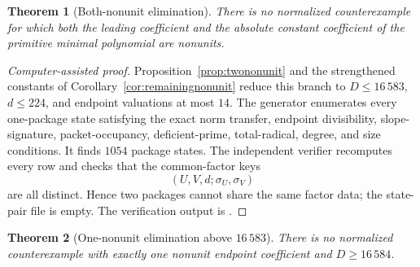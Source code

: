 \documentclass[11pt]{article}
\newtheorem{theorem}{Theorem}[section]
\theoremstyle{definition}
\begin{document}
\begin{theorem}[Both-nonunit elimination]
\label{thm:twononunitelimination}
There is no normalized counterexample for which both the leading coefficient
and the absolute constant coefficient of the primitive minimal polynomial are
nonunits.
\end{theorem}

\begin{proof}[Computer-assisted proof]
Proposition~\ref{prop:twononunit} and the strengthened constants of
Corollary~\ref{cor:remainingnonunit} reduce this branch to
\(D\leq16\,583\), \(d\leq224\), and endpoint valuations at most \(14\).
The generator enumerates every one-package state satisfying the exact norm
transfer, endpoint divisibility, slope-signature, packet-occupancy,
deficient-prime, total-radical, degree, and size conditions.  It finds
\(1054\) package states.  The independent verifier recomputes every row and
checks that the common-factor keys
\[
 (U,V,d;\sigma_U,\sigma_V)
\]
are all distinct.  Hence two packages cannot share the same factor data; the
state-pair file is empty.  The verification output is
.
\end{proof}

\begin{theorem}[One-nonunit elimination above \(16\,583\)]
\label{thm:onenonunitlargeelimination}
There is no normalized counterexample with exactly one nonunit endpoint
coefficient and \(D\geq16\,584\).
\end{theorem}
\end{document}
